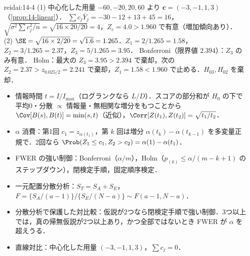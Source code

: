 \begin{kaitou}{reidai:14-4}
(1) 中心化した用量 $-60,-20,20,60$ より $\bm c=(-3,-1,1,3)$（\cref{prop:14-linear}）．
$\sum c_j\bar Y_j=-30-12+13+45=16$，$\sqrt{\sigma^2\sum c_j^2/n}=\sqrt{16\times20/20}=4$，$Z_c=4.0>1.960$ で有意（増加傾向あり）．\\
(2) $\SE=\sqrt{16\times2/20}=\sqrt{1.6}=1.265$．$Z_1=2/1.265=1.58$，$Z_2=3/1.265=2.37$，$Z_3=5/1.265=3.95$．
Bonferroni（限界値 $2.394$）：$Z_3$ のみ有意．
Holm：最大の $Z_3=3.95>2.394$ で棄却，次の $Z_2=2.37>z_{0.025/2}=2.241$ で棄却，$Z_1=1.58<1.960$ で止める．$H_{03},H_{02}$ を棄却．
\end{kaitou}

\begin{summarybox}
\begin{itemize}
\item 情報時間 $t=I/I_{\max}$（ログランクなら $L/D$）．スコアの部分和が $H_0$ の下で平均0・分散 $\propto$ 情報量・無相関な増分をもつことから $\Cov[B(s),B(t)]=\min(s,t)$（近似），$\Corr[Z(t_1),Z(t_2)]=\sqrt{t_1/t_2}$．
\item $\alpha$ 消費：第1回 $c_1=z_{\alpha(t_1)}$，第 $k$ 回は増分 $\alpha(t_k)-\alpha(t_{k-1})$ を多変量正規で．2回なら $\Prob(Z_1\le c_1,Z_2>c_2)=\alpha(1)-\alpha(t_1)$．
\item FWER の強い制御：Bonferroni（$\alpha/m$），Holm（$p_{(k)}\le\alpha/(m-k+1)$ のステップダウン），閉検定手順，固定順序検定．
\item 一元配置分散分析：$S_T=S_A+S_E$，$F=\{S_A/(a-1)\}/\{S_E/(N-a)\}\sim F(a-1,N-a)$．
\item 分散分析で保護した対比較：仮説が2つなら閉検定手順で強い制御．3つ以上では，真の帰無仮説が2つ以上あり，かつ全部ではないとき FWER が $\alpha$ を超えうる．
\item 直線対比：中心化した用量 $(-3,-1,1,3)$，$\sum c_j=0$．
\end{itemize}
\end{summarybox}
